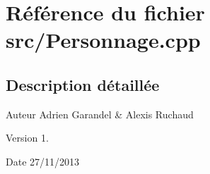 \section{Référence du fichier src/\-Personnage.cpp}
\label{_personnage_8cpp}


\subsection{Description détaillée}
\begin{DoxyAuthor}{Auteur}
Adrien Garandel \& Alexis Ruchaud 
\end{DoxyAuthor}
\begin{DoxyVersion}{Version}
1. 
\end{DoxyVersion}
\begin{DoxyDate}{Date}
27/11/2013 
\end{DoxyDate}
